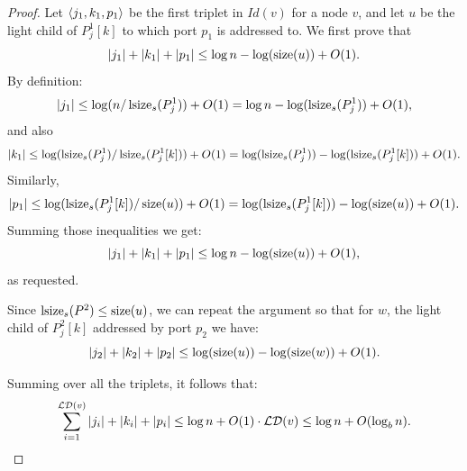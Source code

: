  \begin{proof}
 Let  $\left \langle j_1,k_1,p_1 \right \rangle $ be the first triplet in $Id(v)$ for a node $v$, and let $u$ be the light   child of  $P^1_j[k]$ to which port $p_1$ is addressed to.
  We first prove that $$\vert j_1 \vert + \vert k_1 \vert + \vert p_1 \vert \leq  \log n - \log (\operatorname{size}(u))+ O(1).$$
  By definition: 
  $$\vert j_1 \vert  \leq \log (n/\operatorname{lsize}_s(P^1_j)) +O(1) = \log n - \log (\operatorname{lsize}_s(P^1_j))+O(1),$$ and also 
    $$\vert k_1 \vert  \leq \log (\operatorname{lsize}_s(P^1_j) /\operatorname{lsize}_s(P^1_j[k]))+O(1) = \log (\operatorname{lsize}_s(P^1_j)) - \log(\operatorname{lsize}_s(P^1_j[k]))+O(1). $$
    Similarly, 
    $$ \vert p_1 \vert \leq \log( \operatorname{lsize}_s(P^1_j[k]) / \operatorname{size}(u) ) +O(1) =  \log( \operatorname{lsize}_s(P^1_j[k])) - \log (\operatorname{size}(u)) +O(1).$$
    Summing those inequalities we get:
    $$\vert j_1 \vert + \vert k_1 \vert + \vert p_1 \vert \leq  \log n - \log (\operatorname{size}(u))+ O(1),$$ as requested.
    
    Since $\operatorname{lsize}_s(P^2) \leq \operatorname{size}(u)$, we can repeat the argument so that for $w$, the light child of $P^2_j[k]$ addressed  by port $p_2$ we have:
     $$\vert j_2 \vert + \vert k_2 \vert + \vert p_2 \vert \leq  \log (\operatorname{size}(u)) - \log (\operatorname{size}(w))+ O(1).$$
     
     Summing over all the triplets, it follows that:
     $$\sum_{i=1}^{ \mathcal{LD}(v)} \vert j_i \vert + \vert k_i \vert + \vert p_i \vert  \leq \log n +O(1) \cdot  \mathcal{LD}(v) \leq \log n + O(\log_b n).$$
 \end{proof}

